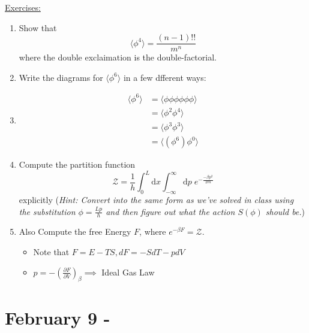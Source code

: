\documentclass{article}
\newcommand{\mean}[1]{\langle #1 \rangle}
\begin{document}
\vskip 0.5cm
\begin{dottedbox}
  \underline{Exercises:}
  \begin{enumerate}
    \item Show that 
    \[ \mean{\phi^4} = \frac{(n - 1)!!}{m^n} \] where the double exclaimation is the double-factorial.

  \vskip 0.5cm
  \item Write the diagrams for $\mean{\phi^6}$ in a few dfferent ways:
  \item \begin{align*}
    \mean{\phi^6} &= \mean{\phi \phi \phi \phi \phi \phi} \\
    &= \mean{\phi^2 \phi^4} \\
    &= \mean{\phi^3 \phi^3} \\
    &= \mean{(\phi^6) \phi^0}
  \end{align*}

  \vskip 0.5cm
  \item Compute the partition function
  \[ \mathcal{Z} = \frac{1}{h} \int_0^{L} \mathrm{d}x \int_{-\infty}^{\infty} \mathrm{d}p\;e^{-\frac{-\beta p^2}{2m}} \]
  explicitly (\emph{Hint: Convert into the same form as we've solved in class using the substitution $\phi = \frac{Lp}{h}$ and then figure out what the action $S(\phi)$ should be.})

  \item Also Compute the free Energy $F$, where $e^{-\beta F} = \mathcal{Z}$.
  \begin{itemize}
    \item Note that $F =  E - TS, dF = -S dT - pdV$
    \item $p = -\left( \frac{\partial F}{\partial V} \right)_{\beta} \implies$ Ideal Gas Law
  \end{itemize}
  \end{enumerate}
\end{dottedbox}

\pagebreak

\section{February 9 - }
\end{document}
